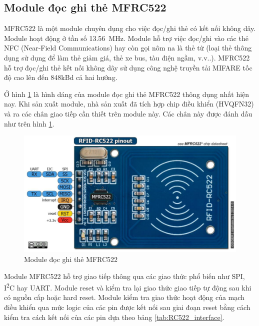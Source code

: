 \subsection{Module đọc ghi thẻ MFRC522}
MFRC522 là một module chuyên dụng cho việc đọc/ghi thẻ có kết nối không dây.
Module hoạt động ở tần số \si{\num{13.56}\mega\hertz}.
Module hỗ trợ việc đọc/ghi vào các thẻ NFC (Near-Field Communications) hay còn gọi nôm na là
thẻ từ (loại thẻ thông dụng sử dụng để làm thẻ giảm giá, thẻ xe bus, tàu điện ngầm, v.v..).
MFRC522 hỗ trợ đọc/ghi thẻ kết nối không dây sử dụng công nghệ truyền tải MIFARE tốc độ cao lên đến \si{848}{kBd} cả hai hướng.

Ở hình \ref{fig:rc522} là hình dáng của module đọc ghi thẻ MFRC522 thông dụng nhất hiện nay.
Khi sản xuất module, nhà sản xuất đã tích hợp chip điều khiển (HVQFN32) và ra các chân giao tiếp cần thiết trên module này.
Các chân này được đánh dấu như trên hình \ref{fig:rc522}.
\begin{figure}[ht]
\centering
\includegraphics[scale=0.35]{images/rc522.jpg}
\caption{Module đọc ghi thẻ MFRC522}
\label{fig:rc522}
\end{figure}

\newpage
Module MFRC522 hỗ trợ giao tiếp thông qua các giao thức phổ biến như SPI, I\textsuperscript{2}C hay UART.
Module reset và kiểm tra lại giao thức giao tiếp tự động sau khi có nguồn cấp hoặc hard reset.
Module kiểm tra giao thức hoạt động của mạch điều khiển qua mức logic của các pin được kết nối sau giai đoạn reset
bằng cách kiểm tra cách kết nối của các pin dựa theo bảng \ref{tab:RC522_interface}.

